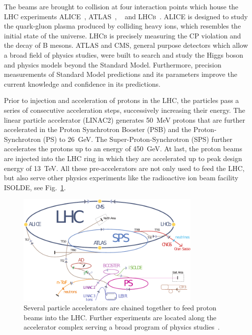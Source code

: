The beams are brought to collision at four interaction points which house the
LHC experiments ALICE~\cite{ALICE}, ATLAS~\cite{ATLASa},
\CMS~\cite{Bayatian:922757,Ball:2007zza,Chatrchyan:2008aa} and
\textsc{LHCb}~\cite{LHCb}. ALICE is designed to study the quark-gluon plasma
produced by colliding heavy ions, which resembles the initial state of the
universe. \textsc{LHCb} is precisely measuring the CP violation and the decay of B
mesons. ATLAS and CMS, general purpose detectors which allow a broad field of
physics studies, were built to search and study the Higgs boson and physics
models beyond the Standard Model. Furthermore, precision measurements of
Standard Model predictions and its parameters improve the current knowledge and
confidence in its predictions.

Prior to injection and acceleration of protons in the LHC, the particles pass a
series of consecutive acceleration steps, successively increasing their energy.
The linear particle accelerator (LINAC2) generates \SI{50}{\mega \electronvolt}
protons that are further accelerated in the Proton Synchrotron Booster (PSB) and
the Proton-Synchrotron (PS) to \SI{26}{\giga \electronvolt}. The
Super-Proton-Synchrotron (SPS) further accelerates the protons up to an energy
of \SI{450}{\giga \electronvolt}. At last, the proton beams are injected into
the LHC ring in which they are accelerated up to peak design energy of
\SI{13}{\tera\electronvolt}. All these pre-accelerators are not only used to
feed the LHC, but also serve other physics experiments like the radioactive ion
beam facility ISOLDE, see Fig.~\ref{fig:lhc_complex}.

\begin{figure}[htbp]
    \centering
    \includegraphics[width=0.8\textwidth]{figures/experimental_setup/lhc_accelerator_chain.pdf}
    \caption[\CERN accelerator complex]{Several particle accelerators are
        chained together to feed proton beams into the LHC. Further experiments are
        located along the accelerator complex serving a broad program of physics
        studies~\cite{LHC:COMPLEX}.}
    \label{fig:lhc_complex}
\end{figure}

